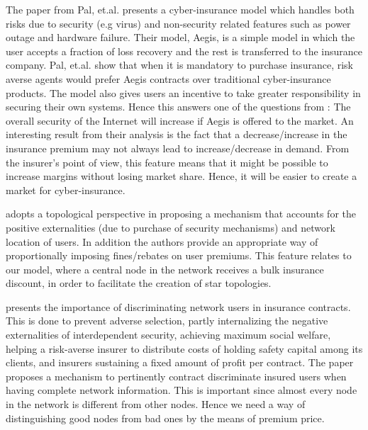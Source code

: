 The paper \cite{pal2011aegis} from Pal, et.al. presents a cyber-insurance model which handles both risks due to security (e.g virus) and non-security related features such as power outage and hardware failure. Their model, Aegis, is a simple model in which the user accepts a fraction of loss recovery and the rest is transferred to the insurance company. Pal, et.al. show that when it is mandatory to purchase insurance, risk averse agents would prefer Aegis contracts over traditional cyber-insurance products.
The model also gives users an incentive to take greater responsibility in securing their own systems. Hence this answers one of the questions from \cite{bohme2010modeling}: The overall security of the Internet will increase if Aegis is offered to the market. An interesting result from their analysis is the fact that a decrease/increase in the insurance premium may not always lead to increase/decrease in demand. From the insurer's point of view, this feature means that it might be possible to increase margins without losing market share. Hence, it will be easier to create a market for cyber-insurance.  

\cite{pal2012cyberinsurance} adopts a topological perspective in proposing a mechanism that accounts for the positive
 externalities (due to purchase of security mechanisms) and network location of users. In addition the authors provide an appropriate way of proportionally imposing fines/rebates on user premiums. This feature relates to our model, where a central node in the network receives a bulk insurance discount, in order to facilitate the creation of star topologies. 
  
\cite{paldifferentiating} presents the importance of discriminating network users in insurance contracts. This is done to prevent adverse selection, partly internalizing the negative externalities of interdependent security, achieving maximum social welfare, helping a risk-averse insurer to distribute costs of holding safety capital among its clients, and insurers sustaining a fixed amount of profit per contract.
The paper proposes a mechanism to pertinently contract discriminate insured users when having complete network information. This is important since almost every node in the network is different from other nodes. Hence we need a way of distinguishing good nodes from bad ones by the means of premium price.

  